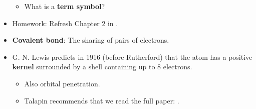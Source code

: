 \documentclass[../notes.tex]{subfiles}
\begin{document}
\begin{itemize}
\begin{itemize}
        \item What is a \textbf{term symbol}?
    \end{itemize}
    \item Homework: Refresh Chapter 2 in \textcite{bib:MiesslerFischerTarr}.
    \item \textbf{Covalent bond}: The sharing of pairs of electrons.
    \item G. N. Lewis predicts in 1916 (before Rutherford) that the atom has a positive \textbf{kernel} surrounded by a shell containing up to 8 electrons.
    \begin{itemize}
        \item Also orbital penetration.
        \item Talapin recommends that we read the full paper: \textcite{bib:Lewis}.
    \end{itemize}
\end{itemize}
\end{document}
